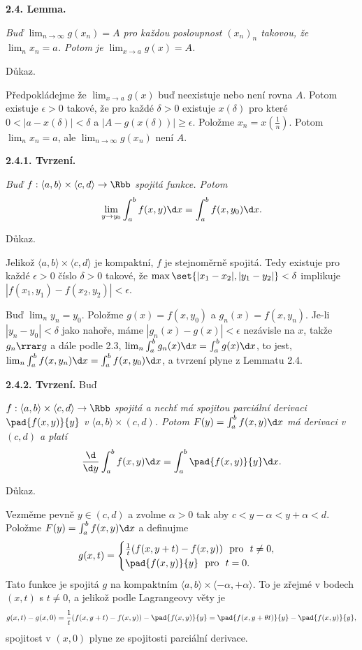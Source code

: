 \documentclass[12pt]{article}
\begin{document}
\bigskip
	
	{\bf 2.4. Lemma.} {\em Buď $\lim_{n\to\infty}g(x_n)=A$ pro každou posloupnost $(x_n)_n$ takovou, že $\lim_nx_n=a$. Potom je $\lim_{x\to a}g(x)=A$.
	
	Důkaz.} Předpokládejme že $\lim_{x\to a}g(x)$ buď neexistuje nebo není rovna  $A$.
	Potom existuje $\epsilon>0$ takové, že pro každé $\delta>0$ existuje $x(\delta)$ pro které $0<|a-x(\delta)|<\delta$ a $|A-g(x(\delta))|\geq\epsilon$. Položme
	$x_n=x(\frac1n)$. Potom $\lim_nx_n=a$, ale $\lim_{n\to\infty}g(x_n)$ není $A$.\sq
	
	\medskip
	
	{\bf 2.4.1. Tvrzení.} {\em Buď $f:\langle a,b\rangle\times
	\langle c,d \rangle\to\Rbb$ spojitá funkce. Potom
$$
	\lim_{y\to y_0}\int_a^bf(x,y)\d x=\int_a^bf(x,y_0)\d x.
	$$
	
	Důkaz.} Jelikož $\langle a,b\rangle\times\langle c,d \rangle$ je kompaktní,
	$f$ je stejnoměrně spojitá. Tedy existuje pro každé $\epsilon>0$ číslo $\delta>0$ takové, že $\max\set{|x_1-x_2|,|y_1-y_2|}<\delta$ implikuje
	$|f(x_1,y_1)-f(x_2,y_2)|<\epsilon$. 
	
	Buď $\lim_ny_n=y_0$. Položme $g(x)=f(x,y_0)$ a $g_n(x)=f(x,y_n)$. Je-li $|y_n-y_0|<\delta$ jako nahoře,
	máme $|g_n(x)-g(x)|<\epsilon$ nezávisle na $x$, takže $g_n\rrar g$
	a dále podle 2.3, $\lim_n\int_a^bg_n(x)\d x=\int_a^b g(x)\d x$, to jest,
	$\lim_n\int_a^bf(x,y_n)\d x=\int_a^bf(x,y_0)\d x$, a tvrzení plyne z Lemmatu 2.4. \sq
	
	\bigskip
	
	{\bf 2.4.2. Tvrzení.} Buď {\em 
	 $f:\langle a,b\rangle\times
	\langle c,d \rangle\to\Rbb$ spojitá a nechť má spojitou parciální derivaci $\pad{f(x,y)}{y}$ v  $\langle a,b\rangle\times
	(c,d)$. Potom $F(y)=\int_a^bf(x,y)\d x$ má derivaci v $(c,d)$ a platí
	$$
	\frac{\d}{\d y}\int_a^bf(x,y)\d x=\int_a^b\pad{f(x,y)}{y}\d x.
	$$
	
	Důkaz.} Vezměme pevně $y\in (c,d)$ a zvolme $\alpha>0$ tak aby $c<y-\alpha<y+\alpha<d$. Položme $F(y)=\int_a^bf(x,y)\d x$ a definujme
	$$
	g(x,t)=\begin{cases} \frac1t(f(x,y+t)-f(x,y))\ \ \text{pro}\ \ t\neq 0,\\
	             \pad{f(x,y)}{y}\ \ \text{pro}\ \ t=0.
							\end{cases}
							$$
Tato funkce je spojitá $g$ na kompaktním $\langle a,b\rangle\times
\langle -\alpha,+\alpha\rangle$. To je zřejmé v bodech $(x,t)$ s $t\neq 0$, a jelikož podle Lagrangeovy věty je
$$
g(x,t)-g(x,0)=\frac1t(f(x,y+t)-f(x,y))-\pad{f(x,y)}{y}=
\pad{f(x,y+\theta t)}{y}-\pad{f(x,y)}{y},
$$						
spojitost v $(x,0)$ plyne ze spojitosti parciální derivace.
\end{document}
